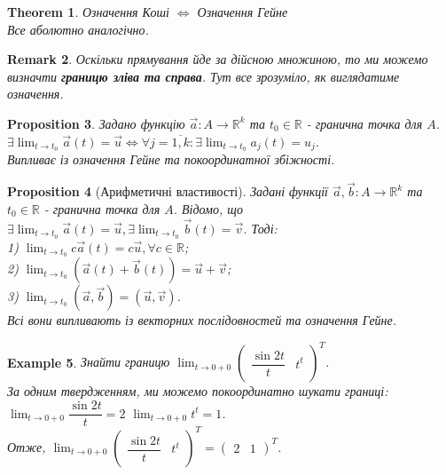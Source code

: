 \documentclass[a4paper, 10pt]{article}
\def\huge{\displaystyle}
\theoremstyle{theoremdd}
\newtheorem{theorem}{Theorem}[subsection]
\theoremstyle{theoremdd}
\theoremstyle{theoremdd}
\theoremstyle{theoremdd}
\newtheorem{example}[theorem]{Example}
\theoremstyle{theoremdd}
\newtheorem{proposition}[theorem]{Proposition}
\theoremstyle{theoremdd}
\newtheorem{remark}[theorem]{Remark}
\theoremstyle{theoremdd}
\theoremstyle{theoremdd}
\begin{document}
\begin{theorem}
Означення Коші $\iff$ Означення Гейне\\
\textit{Все аболютно аналогічно.}
\end{theorem}

\begin{remark}
Оскільки прямування йде за дійсною множиною, то ми можемо визначти \textbf{границю зліва та справа}. Тут все зрозуміло, як виглядатиме означення.
\end{remark}

\begin{proposition}
Задано функцію $\vec{a}: A \to \mathbb{R}^k$ та $t_0 \in \mathbb{R}$ - гранична точка для $A$.\\
$\exists \huge\lim_{t \to t_0} \vec{a}(t) = \vec{u} \iff \forall j = \overline{1,k}: \exists \lim_{t \to t_0} a_j(t) = u_j$.\\
\textit{Випливає із означення Гейне та покоординатної збіжності.}
\end{proposition}

\begin{proposition}[Арифметичні властивості]
Задані функції $\vec{a},\vec{b}: A \to \mathbb{R}^k$ та $t_0 \in \mathbb{R}$ - гранична точка для $A$. Відомо, що \\ $\exists \huge \lim_{t \to t_0} \vec{a}(t) = \vec{u}, \exists \lim_{t \to t_0} \vec{b}(t) = \vec{v}$. Тоді:\\
1) $\huge \lim_{t \to t_0} c \vec{a}(t) = c \vec{u}, \forall c \in \mathbb{R}$;\\
2) $\huge \lim_{t \to t_0} (\vec{a}(t) + \vec{b}(t)) = \vec{u} + \vec{v}$;\\
3) $\huge \lim_{t \to t_0} (\vec{a},\vec{b}) = (\vec{u},\vec{v})$.\\
\textit{Всі вони випливають із векторних послідовностей та означення Гейне.}
\end{proposition}

\begin{example}
Знайти границю $\huge\lim_{t \to 0+0} \begin{pmatrix}
\dfrac{\sin 2t}{t} & t^t
\end{pmatrix}^T$.\\
За одним твердженням, ми можемо покоординатно шукати границі:\\
$\huge\lim_{t \to 0+0} \dfrac{\sin 2t}{t} = 2$ \hspace{1cm} $\huge\lim_{t \to 0+0} t^t = 1$.\\
Отже, $\huge\lim_{t \to 0+0} \begin{pmatrix}
\dfrac{\sin 2t}{t} & t^t
\end{pmatrix}^T = \begin{pmatrix}
2 & 1
\end{pmatrix}^T$.
\end{example}
\end{document}

